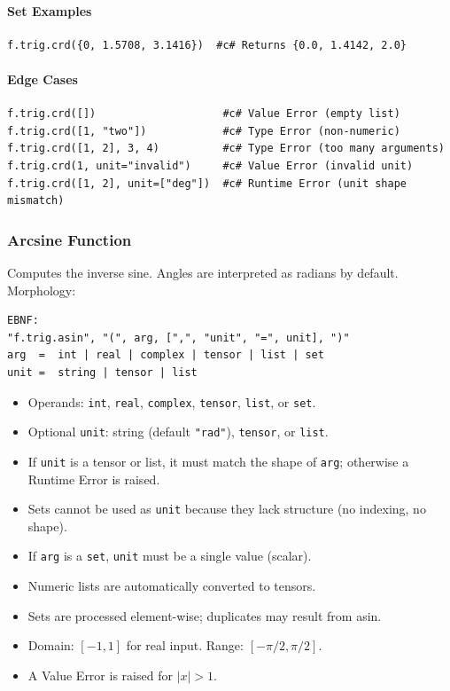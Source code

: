 \paragraph{Set Examples}
\begin{verbatim}
f.trig.crd({0, 1.5708, 3.1416})  #c# Returns {0.0, 1.4142, 2.0}
\end{verbatim}

\paragraph{Edge Cases}
\begin{verbatim}
f.trig.crd([])                    #c# Value Error (empty list)
f.trig.crd([1, "two"])            #c# Type Error (non-numeric)
f.trig.crd([1, 2], 3, 4)          #c# Type Error (too many arguments)
f.trig.crd(1, unit="invalid")     #c# Value Error (invalid unit)
f.trig.crd([1, 2], unit=["deg"])  #c# Runtime Error (unit shape mismatch)
\end{verbatim}

\subsubsection{Arcsine Function}
Computes the inverse sine. Angles are interpreted as radians by default.\\
Morphology:
\begin{verbatim}
EBNF:
"f.trig.asin", "(", arg, [",", "unit", "=", unit], ")"
arg  =  int | real | complex | tensor | list | set
unit =  string | tensor | list
\end{verbatim}
\begin{itemize}
\item Operands: \texttt{int}, \texttt{real}, \texttt{complex}, \texttt{tensor}, \texttt{list}, or \texttt{set}.
\item Optional \texttt{unit}: string (default \texttt{"rad"}), \texttt{tensor}, or \texttt{list}.
\item If \texttt{unit} is a tensor or list, it must match the shape of \texttt{arg}; otherwise a Runtime Error is raised.
\item Sets cannot be used as \texttt{unit} because they lack structure (no indexing, no shape).
\item If \texttt{arg} is a \texttt{set}, \texttt{unit} must be a single value (scalar).
\item Numeric lists are automatically converted to tensors.
\item Sets are processed element-wise; duplicates may result from asin.
\item Domain: $[-1, 1]$ for real input. Range: $[-\pi/2, \pi/2]$.
\item A Value Error is raised for $|x| > 1$.
\end{itemize}

